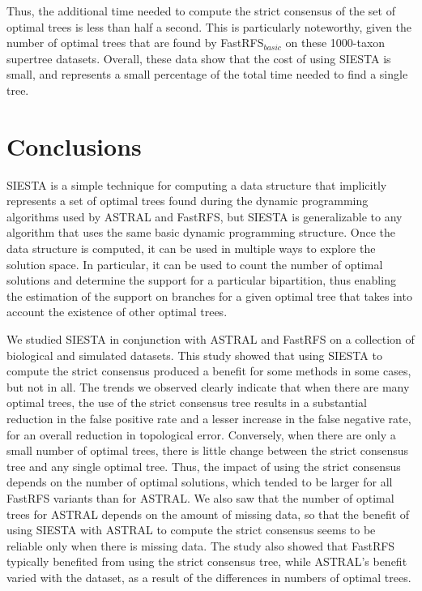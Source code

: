 Thus, the additional time needed to compute the strict consensus of the set of optimal trees is less than half a second. This is particularly noteworthy, given the number of optimal trees that are found by FastRFS$_{basic}$ on these 1000-taxon supertree datasets. Overall, these data show that the cost of using SIESTA is small, and represents a small percentage of the total time needed to find a single tree.


\section{Conclusions}



SIESTA is a simple technique for computing a data structure that implicitly represents a set of optimal trees found during the dynamic programming algorithms used by ASTRAL and FastRFS, but  SIESTA is generalizable to any algorithm that uses the same basic dynamic programming structure. 
Once the data structure is computed, it can be used in multiple ways to explore the solution space. 
In particular, it can be used to count the number of optimal solutions and determine the support for a particular bipartition, thus enabling the estimation of the support on branches for a given optimal tree that takes into account the existence of  other optimal trees.

We studied SIESTA in conjunction with ASTRAL and FastRFS on a collection of biological and simulated datasets. This study showed that using SIESTA to compute the strict consensus produced a benefit for some methods in some cases, but not in all.
The trends we observed clearly indicate that when there are many optimal trees, the use of the strict consensus tree results in a substantial reduction in the false positive rate and a lesser increase in the false negative rate, for an overall reduction in topological error. 
Conversely, when there are only a small number of optimal trees, there is little change between the strict consensus tree and any single optimal tree.
Thus, the impact of using the strict consensus depends on the number of optimal solutions, which tended to be larger for all FastRFS variants than for ASTRAL.
We also saw that the number of optimal trees for ASTRAL depends on the amount of missing data, so that the benefit of using SIESTA with ASTRAL to compute the strict consensus seems to be reliable only when there is missing data. 
The study also showed that  FastRFS typically benefited from using the strict consensus tree, while ASTRAL's benefit varied with the dataset, as a result of the differences in numbers of optimal trees.


